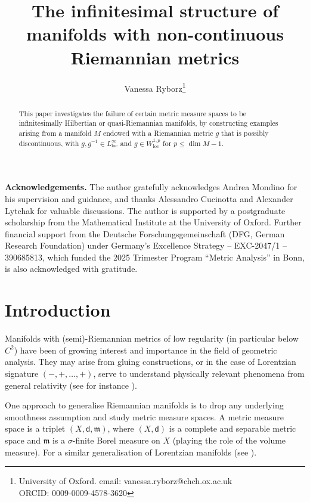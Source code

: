 \documentclass[a4paper,10pt]{article}
\title{The infinitesimal structure of manifolds with non-continuous Riemannian metrics}
\author{Vanessa Ryborz\thanks{University of Oxford. email: vanessa.ryborz@chch.ox.ac.uk \\
ORCID: 0009-0009-4578-3620
}}
\date{}
\numberwithin{equation}{section}
\newcommand{\sfd}{\mathsf d}
\begin{document}
\maketitle
\begin{abstract}
 This paper investigates the failure of certain metric measure spaces to be infinitesimally Hilbertian or quasi-Riemannian manifolds, by constructing examples arising from a manifold \( M \) endowed with a Riemannian metric  $g$ that is possibly discontinuous, with $ g, g^{-1} \in L^\infty_{\mathrm{loc}} $ and $ g \in W^{1,p}_{\mathrm{loc}} $ for $ p \leq \dim M - 1 $.
 \let\thefootnote\relax{}
\end{abstract}

\tableofcontents

{\small \textbf{Acknowledgements.} 
The author gratefully acknowledges Andrea Mondino for his supervision and guidance, and thanks Alessandro Cucinotta and Alexander Lytchak for valuable discussions. The author is supported by a postgraduate scholarship from the Mathematical Institute at the University of Oxford. Further financial support from the Deutsche Forschungsgemeinschaft (DFG, German Research Foundation) under Germany’s Excellence Strategy – EXC-2047/1 – 390685813, which funded the 2025 Trimester Program ``Metric Analysis” in Bonn, is also acknowledged with gratitude.
}

\section{Introduction}
Manifolds with (semi)-Riemannian metrics of low regularity (in particular below $C^2$) have been of growing interest and importance in the field of geometric analysis. They may arise from gluing constructions, or in the case of Lorentzian signature $(-, +, \ldots, +)$, serve to understand physically relevant phenomena from general relativity (see for instance \cite{calisti2025hawking}). 

One approach to generalise Riemannian manifolds is to drop any underlying smoothness assumption and study metric measure spaces. A metric measure space is a triplet $(X, \sfd, \mathfrak{m})$, where $(X, \sfd)$ is a complete and separable metric space and $\mathfrak{m}$ is a $\sigma$-finite Borel measure on $X$ (playing the role of the volume measure). For a similar generalisation of Lorentzian manifolds (see \cite{kunzinger2018lorentzian, cavalletti2020optimal}).
\end{document}

